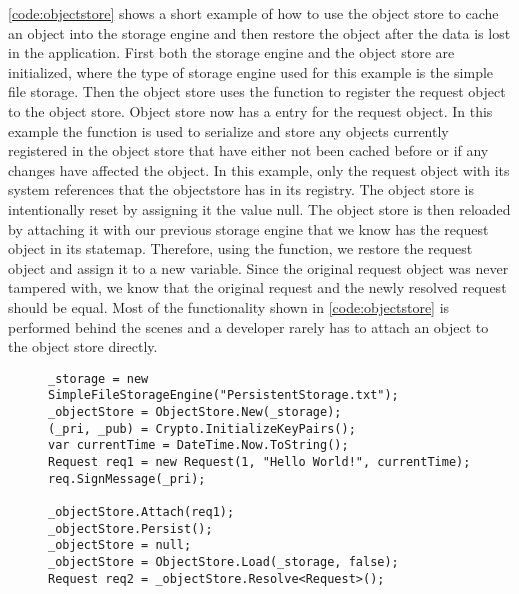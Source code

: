 \autoref{code:objectstore} shows a short example of how to use the object store to cache an object into the storage engine and then restore the object after the data is lost in the application. First both the storage engine and the object store are initialized, where the type of storage engine used for this example is the simple file storage. Then the object store uses the  function to register the request object to the object store. Object store now has a  entry for the request object. In this example the  function is used to serialize and store any objects currently registered in the object store that have either not been cached before or if any changes have affected the object. In this example, only the request object with its system references that the objectstore has in its registry. The object store is intentionally reset by assigning it the value null. The object store is then reloaded by attaching it with our previous storage engine that we know has the request object in its statemap. Therefore, using the  function, we restore the request object and assign it to a new variable. Since the original request object was never tampered with, we know that the original request and the newly resolved request should be equal. Most of the functionality shown in \autoref{code:objectstore} is performed behind the scenes and a developer rarely has to attach an object to the object store directly. 

\begin{figure}[H]
	\centering
	\begin{lstlisting}[label = code:objectstore, caption=Object Store example, captionpos=b, basicstyle=\scriptsize]
_storage = new SimpleFileStorageEngine("PersistentStorage.txt");
_objectStore = ObjectStore.New(_storage);
(_pri, _pub) = Crypto.InitializeKeyPairs();	
var currentTime = DateTime.Now.ToString();
Request req1 = new Request(1, "Hello World!", currentTime);
req.SignMessage(_pri);
           
_objectStore.Attach(req1);
_objectStore.Persist();
_objectStore = null;
_objectStore = ObjectStore.Load(_storage, false);
Request req2 = _objectStore.Resolve<Request>();
	\end{lstlisting}
\end{figure}

